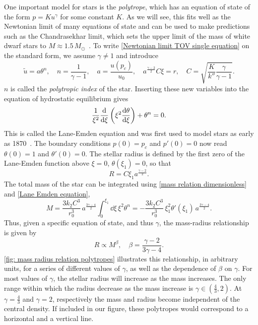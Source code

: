 One important model for stars is the \emph{polytrope}, which has an equation of state of the form $p = K u^\gamma$ for some constant $K$.
As we will see, this fits well as the Newtonian limit of many equations of state and can be used to make predictions such as the Chandrasekhar limit, which sets the upper limit of the mass of white dwarf stars to $M \approx 1.5 \, M_\odot$~\autocite{chandrasekharHighlyCollapsedConfigurations1935,glendenningCompactStarsNuclear2012}.
To write \autoref{Newtonian limit TOV single equation} on the standard form, we assume $\gamma \neq 1$ and introduce
%
\begin{equation}
    \tilde u = a \theta^{n}, \quad 
    n = \frac{1}{\gamma - 1}, \quad 
    a = \frac{u(p_c)}{u_0}, 
    \quad a^{\frac{\gamma - 2}{2}}C \xi = r, \quad 
    C =\sqrt{ \frac{K}{k''} \frac{\gamma}{\gamma - 1}}.
\end{equation}
%
$n$ is called the \emph{polytropic index} of the star.
Inserting these new variables into the equation of hydrostatic equilibrium gives
%
\begin{equation}
    \label{Lane Emden equation}
    \frac{1}{\xi^2} \odv{}{\xi} \left(\xi^2 \odv{\theta}{\xi} \right) + \theta^n = 0.
\end{equation}
%
This is called the Lane-Emden equation and was first used to model stars as early as 1870~\autocite{laneTheoreticalTemperatureSun1870}.
The boundary conditions $p(0) = p_c$ and $p'(0) = 0$ now read $\theta(0) = 1$ and $\theta'(0) = 0$.
The stellar radius is defined by the first zero of the Lane-Emden function above $\xi = 0$, $\theta(\xi_1) = 0$, so that
%
\begin{equation}
    \label{Radius polytrope}
    R = C \xi_1  a^{\frac{\gamma-2}{2}}. 
\end{equation}
%
The total mass of the star can be integrated using \autoref{mass relation dimensionless} and \autoref{Lane Emden equation},
%
\begin{equation}
    M = \frac{3 k_2 C^3 }{r_0^3}\, a^{\frac{3\gamma-4}{2}}  \int^{\xi_1}_0 \dd \xi \, \xi^2 \theta^n = - \frac{3 k_2 C^3 }{r_0^3}\, \xi_1^2 \theta'(\xi_1)\, a^{\frac{3\gamma-4}{2}}.
\end{equation}
%
Thus, given a specific equation of state, and thus $\gamma$, the mass-radius relationship is given by
%
\begin{equation}
    \label{Polytrope mass radius relationship}
    R \propto M^\beta, \quad \beta = {\frac{\gamma - 2}{3 \gamma - 4}}.
\end{equation}
%
\autoref{fig: mass radius relation polytropes} illustrates this relationship, in arbitrary units, for a series of different values of $\gamma$, as well as the dependence of $\beta$ on $\gamma$.
For most values of $\gamma$, the stellar radius will increase as the mass increases.
The only range within which the radius decrease as the mass increase is $\gamma \in \left(\frac{4}{3}, 2 \right)$.
At $\gamma = \frac{4}{3}$ and $\gamma = 2$, respectively the mass and radius become independent of the central density.
If included in our figure, these polytropes would correspond to a horizontal and a vertical line.

